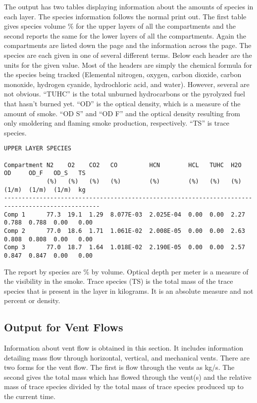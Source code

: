 The output has two tables displaying information about the amounts of species in each layer. The species information follows the normal print out.  The first table gives species volume \% for the upper layers of all the compartments and the second reports the same for the lower layers of all the compartments.  Again the compartments are listed down the page and the information across the page.  The species are each given in one of several different terms.  Below each header are the units for the given value.  Most of the headers are simply the chemical formula for the species being tracked (Elemental nitrogen, oxygen, carbon dioxide, carbon monoxide, hydrogen cyanide, hydrochloric acid, and water).  However, several are not obvious.  ``TUHC'' is the total unburned hydrocarbons or the pyrolyzed fuel that hasn't burned yet.  ``OD'' is the optical density, which is a measure of the amount of smoke. ``OD S'' and ``OD F'' and the optical density resulting from only smoldering and flaming smoke production, respectively. ``TS'' is trace species.

\begin{lstlisting}[basicstyle=\tiny]
UPPER LAYER SPECIES

Compartment N2    O2    CO2   CO         HCN        HCL   TUHC  H2O   OD     OD_F   OD_S   TS
            (%)   (%)   (%)   (%)        (%)        (%)   (%)   (%)   (1/m)  (1/m)  (1/m)  kg
-------------------------------------------------------------------------------------------------
Comp 1      77.3  19.1  1.29  8.077E-03  2.025E-04  0.00  0.00  2.27  0.788  0.788  0.00   0.00
Comp 2      77.0  18.6  1.71  1.061E-02  2.008E-05  0.00  0.00  2.63  0.808  0.808  0.00   0.00
Comp 3      77.0  18.7  1.64  1.018E-02  2.190E-05  0.00  0.00  2.57  0.847  0.847  0.00   0.00
\end{lstlisting}

The report by species are \% by volume. Optical depth per meter is a measure of the visibility in the smoke. Trace species (TS) is the total mass of the trace species that is present in the layer in kilograms. It is an absolute measure and not percent or density.

\subsection{Output for Vent Flows}
Information about vent flow is obtained in this section.  It includes information detailing mass flow through horizontal, vertical, and mechanical vents. There are two forms for the vent flow. The first is flow through the vents as kg/s. The second gives the total mass which has flowed through the vent(s) and the relative mass of trace species divided by the total mass of trace species produced up to the current time.

